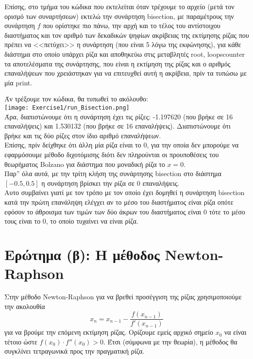 \documentclass[a4paper,11pt]{article}
\newcommand{\lt}{\latintext}
\begin{document}
Επίσης, στο τμήμα του κώδικα που εκτελείται όταν τρέχουμε το αρχείο (μετά τον ορισμό των συναρτήσεων) εκτελώ την συνάρτηση {\lt bisection}, με παραμέτρους την συνάρτηση $f$ που ορίστηκε πιο πάνω, την αρχή και το τέλος του αντίστοιχου διαστήματος και τον αριθμό των δεκαδικών ψηφίων ακρίβειας της εκτίμησης ρίζας που πρέπει να <<πετύχει>> η συνάρτηση (που είναι 5 λόγω της εκφώνησης), για κάθε διάστημα στο οποίο υπάρχει ρίζα και αποθηκεύω στις μεταβλητές {\lt root, loops\textunderscore counter} τα αποτελέσματα της συνάρτησης, που είναι η εκτίμηση της ρίζας και ο αριθμός επαναλήψεων που χρειάστηκαν για να επιτευχθεί αυτή η ακρίβεια, πρίν τα τυπώσω με μία {\lt print}.

\par
\vspace{20pt}

Άν τρέξουμε τον κώδικα, θα τυπωθεί το ακόλουθο:\\

\texttt{[image: Exercise1/run\_Bisection.png]}\\

Άρα, διαπιστώνουμε ότι η συνάρτηση έχει τις ρίζες: -1.197620 (που βρήκε σε 16 επαναλήψεις) και 1.530132 (που βρήκε σε 16 επαναλήψεις). Διαπιστώνουμε ότι βρήκε και τις δύο ρίζες στον ίδιο αριθμό επαναλήψεων.\\
Επίσης, πρίν δείχθηκε ότι άλλη μία ρίζα είναι το 0, για την οποία δεν μπορούμε να εφαρμόσουμε μέθοδο διχοτόμισης διότι δεν πληρούνται οι προυποθέσεις του θεωρήματος {\lt Bolzano} για διάστημα που μοναδική ρίζα το $x = 0$.\\
Παρ'' όλα αυτά, με την τρίτη κλήση της συνάρτησης {\lt bisection} στο διάστημα $[-0.5, 0.5]$ η συνάρτηση βρίσκει την ρίζα σε 0 επαναλήψεις.\\
Αυτο συμβαίνει γιατί με τον τρόπο με τον οποίο έχει δομηθεί η συνάρτηση {\lt bisection} κατά την πρώτη επανάληψη ελέγχει αν το μέσο του διαστήματος είναι ρίζα οπότε εφόσον το άθροισμα των τιμών των δύο άκρων του διαστήματος είναι 0 τότε το μέσο τους είναι το 0, το οποίο τυχαίνει να είναι ρίζα.

\section{Ερώτημα (β): H μέθοδος {\lt Newton-Raphson}}
\par
Στην μέθοδο {\lt Newton-Raphson} για να βρεθεί προσέγγιση της ρίζας χρησιμοποιούμε την ακολουθία 
\[x_n = x_{n-1} - \dfrac{f(x_{n-1})}{f'(x_{n-1})} \] 
για να βρούμε την επόμενη εκτίμηση ρίζας. Ορίζουμε εμείς αρχικό σημείο $x_0$ να είναι τέτοιο ώστε $f(x_0) \cdot f''(x_0) > 0$. Έτσι (σύμφωνα με την θεωρία), η μέθοδος θα συγκλίνει τετραγωνικά προς την πραγματική ρίζα.\\
\end{document}
